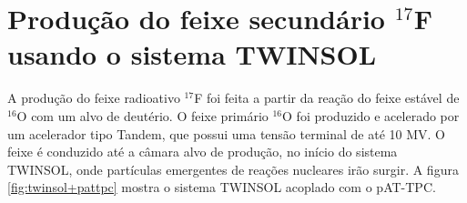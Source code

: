\documentclass[a4paper,12pt,oneside]{book}
\begin{document}





\section{Produção do feixe secundário $^{17}$F usando o sistema TWINSOL}

\par A produção do feixe radioativo $^{17}$F foi feita a partir da reação do feixe estável de $^{16}$O com um alvo de deutério. O feixe primário $^{16}$O foi produzido e acelerado por um acelerador tipo Tandem, que possui uma tensão terminal de até 10 MV\cite{KOLATA1989503, NDtandem}. O feixe é conduzido até a câmara alvo de produção, no início do sistema TWINSOL, onde partículas emergentes de reações nucleares irão surgir. A figura \ref{fig:twinsol+pattpc} mostra o sistema TWINSOL acoplado com o pAT-TPC.
\end{document}
